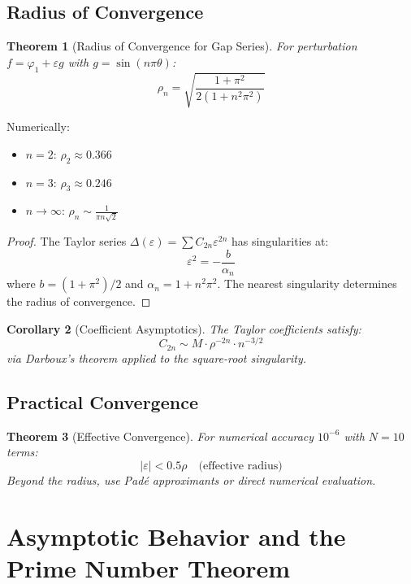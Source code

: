 ﻿\documentclass[12pt,a4paper]{report}
\theoremstyle{plain}
\newtheorem{theorem}{Theorem}[section]
\newtheorem{corollary}[theorem]{Corollary}
\theoremstyle{definition}
\begin{document}
\section{Radius of Convergence}

\begin{theorem}[Radius of Convergence for Gap Series]
\label{thm:radius_convergence}
For perturbation $f = \varphi_1 + \varepsilon g$ with $g = \sin(n\pi\theta)$:
\[
\rho_n = \sqrt{\frac{1+\pi^2}{2(1+n^2\pi^2)}}
\]
\end{theorem}

Numerically:
\begin{itemize}
    \item $n=2$: $\rho_2 \approx 0.366$
    \item $n=3$: $\rho_3 \approx 0.246$
    \item $n \to \infty$: $\rho_n \sim \frac{1}{\pi n\sqrt{2}}$
\end{itemize}

\begin{proof}
The Taylor series $\Delta(\varepsilon) = \sum C_{2n}\varepsilon^{2n}$ has singularities at:
\[
\varepsilon^2 = -\frac{b}{\alpha_n}
\]
where $b = (1+\pi^2)/2$ and $\alpha_n = 1 + n^2\pi^2$. The nearest singularity determines the radius of convergence.
\end{proof}

\begin{corollary}[Coefficient Asymptotics]
The Taylor coefficients satisfy:
\[
C_{2n} \sim M \cdot \rho^{-2n} \cdot n^{-3/2}
\]
via Darboux's theorem applied to the square-root singularity.
\end{corollary}

\section{Practical Convergence}

\begin{theorem}[Effective Convergence]
\label{thm:practical_convergence}
For numerical accuracy $10^{-6}$ with $N=10$ terms:
\[
|\varepsilon| < 0.5\rho \quad \text{(effective radius)}
\]
Beyond the radius, use Pad\'e approximants or direct numerical evaluation.
\end{theorem}

\chapter{Asymptotic Behavior and the Prime Number Theorem}
\label{ch:asymptotic}
\end{document}
